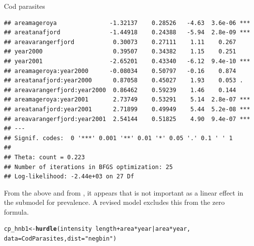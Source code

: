 \documentclass[11pt]{book}\usepackage[]{graphicx}\usepackage[]{color}
\makeatletter
\newcommand{\hlstr}[1]{\textcolor[rgb]{0.192,0.494,0.8}{#1}}%
\newcommand{\hlopt}[1]{\textcolor[rgb]{0,0,0}{#1}}%
\newcommand{\hlstd}[1]{\textcolor[rgb]{0.345,0.345,0.345}{#1}}%
\newcommand{\hlkwb}[1]{\textcolor[rgb]{0.69,0.353,0.396}{#1}}%
\newcommand{\hlkwc}[1]{\textcolor[rgb]{0.333,0.667,0.333}{#1}}%
\newcommand{\hlkwd}[1]{\textcolor[rgb]{0.737,0.353,0.396}{\textbf{#1}}}%
\newenvironment{kframe}{%
 \def\at@end@of@kframe{}%
 \ifinner\ifhmode%
  \def\at@end@of@kframe{\end{minipage}}%
  \begin{minipage}{\columnwidth}%
 \fi\fi%
 \def\FrameCommand##1{\hskip\@totalleftmargin \hskip-\fboxsep
 \colorbox{shadecolor}{##1}\hskip-\fboxsep
     \hskip-\linewidth \hskip-\@totalleftmargin \hskip\columnwidth}%
 \MakeFramed {\advance\hsize-\width
   \@totalleftmargin\z@ \linewidth\hsize
   \@setminipage}}%
 {\par\unskip\endMakeFramed%
 \at@end@of@kframe}
\newenvironment{knitrout}{}{} %
\renewenvironment{knitrout}{\small\renewcommand{\baselinestretch}{.85}}{} %
\makeatother
\begin{document}
\begin{Example}[cod2]{Cod parasites}
\begin{knitrout}
\begin{kframe}
\begin{verbatim}
## areamageroya               -1.32137    0.28526   -4.63  3.6e-06 ***
## areatanafjord              -1.44918    0.24388   -5.94  2.8e-09 ***
## areavarangerfjord           0.30073    0.27111    1.11    0.267    
## year2000                    0.39507    0.34382    1.15    0.251    
## year2001                   -2.65201    0.43340   -6.12  9.4e-10 ***
## areamageroya:year2000      -0.08034    0.50797   -0.16    0.874    
## areatanafjord:year2000      0.87058    0.45027    1.93    0.053 .  
## areavarangerfjord:year2000  0.86462    0.59239    1.46    0.144    
## areamageroya:year2001       2.73749    0.53291    5.14  2.8e-07 ***
## areatanafjord:year2001      2.71899    0.49949    5.44  5.2e-08 ***
## areavarangerfjord:year2001  2.54144    0.51825    4.90  9.4e-07 ***
## ---
## Signif. codes:  0 '***' 0.001 '**' 0.01 '*' 0.05 '.' 0.1 ' ' 1 
## 
## Theta: count = 0.223
## Number of iterations in BFGS optimization: 25 
## Log-likelihood: -2.44e+03 on 27 Df
\end{verbatim}
\end{kframe}
\end{knitrout}
From the above and from , it appears that
 is not important as a linear effect in the submodel for
prevalence.  A revised model excludes this from the zero formula.

\begin{knitrout}
\color{fgcolor}\begin{kframe}
\begin{alltt}
\hlstd{cp_hnb1} \hlkwb{<-} \hlkwd{hurdle}\hlstd{(intensity} \hlopt{~} \hlstd{length} \hlopt{+} \hlstd{area} \hlopt{*} \hlstd{year} \hlopt{|} \hlstd{area}\hlopt{*}\hlstd{year,}
                  \hlkwc{data} \hlstd{= CodParasites,} \hlkwc{dist} \hlstd{=} \hlstr{"negbin"}\hlstd{)}
\end{alltt}
\end{kframe}
\end{knitrout}


\end{Example}
\end{document}
